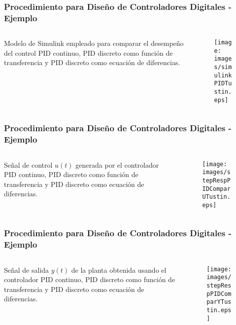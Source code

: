 \documentclass[aspectratio=169]{beamer}
\theoremstyle{definition}
\theoremstyle{plain}
\theoremstyle{remark}
\begin{document}
\begin{frame}[c]\frametitle{Procedimiento para Diseño de Controladores Digitales - Ejemplo}
\begin{columns}
	\begin{column}{0.3\textwidth}
		Modelo de Simulink empleado para comparar el desempeño del control PID continuo, PID discreto como función de transferencia y PID discreto como ecuación de diferencias.
	\end{column}
	\begin{column}{0.7\textwidth}
		\begin{figure}
			\centering
			\texttt{[image: images/simulinkPIDTustin.eps]}
		\end{figure}
	\end{column}
\end{columns}
\end{frame}

\begin{frame}[c]\frametitle{Procedimiento para Diseño de Controladores Digitales - Ejemplo}
\begin{columns}
	\begin{column}{0.3\textwidth}
		Señal de control $u(t)$ generada por el controlador PID continuo, PID discreto como función de transferencia y PID discreto como ecuación de diferencias.
	\end{column}
	\begin{column}{0.7\textwidth}
		\begin{figure}
			\centering
			\texttt{[image: images/stepRespPIDComparUTustin.eps]}
		\end{figure}
	\end{column}
\end{columns}
\end{frame}
 
\begin{frame}[c]\frametitle{Procedimiento para Diseño de Controladores Digitales - Ejemplo}
\begin{columns}
	\begin{column}{0.3\textwidth}
		Señal de salida $y(t)$ de la planta obtenida usando el controlador PID continuo, PID discreto como función de transferencia y PID discreto como ecuación de diferencias.
	\end{column}
	\begin{column}{0.7\textwidth}
		\begin{figure}
			\centering
			\texttt{[image: images/stepRespPIDComparYTustin.eps]}
		\end{figure}
	\end{column}
\end{columns}
\end{frame}
\end{document}
